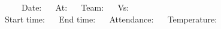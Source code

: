 %
%
%
%
%
%
%
%
%
%
%
%
\pagestyle{empty}

      \setlength{\textwidth}{10.48in}
      \setlength{\oddsidemargin}{-.95in}
      \setlength{\evensidemargin}{-.95in}

      \setlength{\textheight}{7.7in}
      \setlength{\topmargin}{-.95in}



\noindent ~~~~Date: ~\hrulefill~
              At: ~\hrulefill~
              Team: ~\hrulefill~
              Vs: ~\hrulefill~\\

              Start time: ~\hrulefill~
              End time: ~\hrulefill~
              Attendance: ~\hrulefill~
              Temperature: ~\hrulefill~\\
\LARGE

